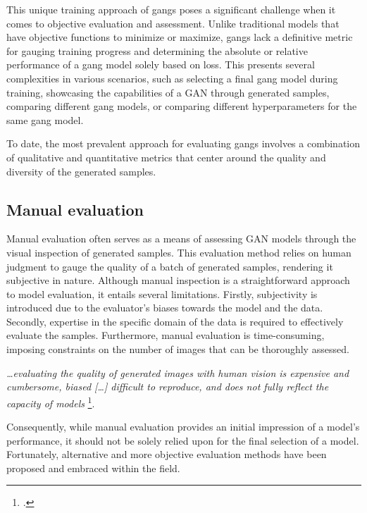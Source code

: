 This unique training approach of \gls{gang}s poses a significant challenge when it comes to objective evaluation and assessment. 
Unlike traditional models that have objective functions to minimize or maximize, \gls{gang}s lack a definitive metric for gauging training progress and determining the absolute or relative performance of a \gls{gang} model solely based on loss. 
This presents several complexities in various scenarios, such as selecting a final \gls{gang} model during training, showcasing the capabilities of a GAN through generated samples, comparing different \gls{gang} models, or comparing different hyperparameters for the same \gls{gang} model.

To date, the most prevalent approach for evaluating \gls{gang}s involves a combination of qualitative and quantitative metrics that center around the quality and diversity of the generated samples.
\subsection{Manual evaluation}
\label{subsec:manual-evaluation}
Manual evaluation often serves as a means of assessing GAN models through the visual inspection of generated samples. 
This evaluation method relies on human judgment to gauge the quality of a batch of generated samples, rendering it subjective in nature. 
Although manual inspection is a straightforward approach to model evaluation, it entails several limitations. 
Firstly, subjectivity is introduced due to the evaluator's biases towards the model and the data. Secondly, expertise in the specific domain of the data is required to effectively evaluate the samples. 
Furthermore, manual evaluation is time-consuming, imposing constraints on the number of images that can be thoroughly assessed.

\emph{…evaluating the quality of generated images with human vision is expensive and cumbersome, biased […] difficult to reproduce, and does not fully reflect the capacity of models}
\footcite{paper:ganeval}.

Consequently, while manual evaluation provides an initial impression of a model's performance, it should not be solely relied upon for the final selection of a model. Fortunately, alternative and more objective evaluation methods have been proposed and embraced within the field.
